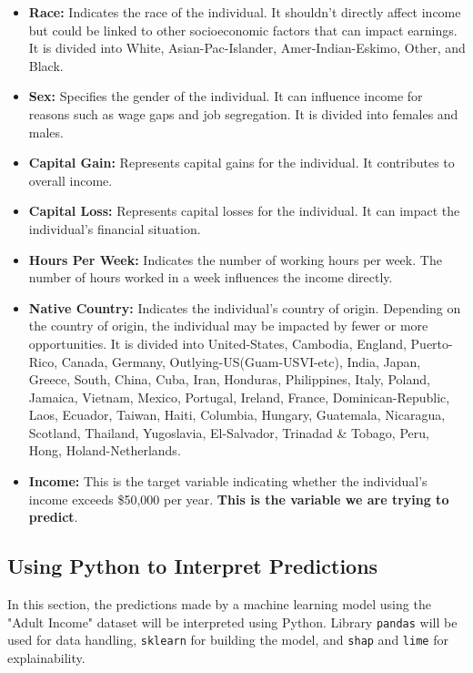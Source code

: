 \documentclass[10pt,journal,compsoc]{IEEEtran}
\begin{document}
\begin{itemize}
    \item \textbf{Race:} Indicates the race of the individual. It shouldn't directly affect income but could be linked to other socioeconomic factors that can impact earnings. It is divided into White, Asian-Pac-Islander, Amer-Indian-Eskimo, Other, and Black.

    \item \textbf{Sex:} Specifies the gender of the individual. It can influence income for reasons such as wage gaps and job segregation. It is divided into females and males.

    \item \textbf{Capital Gain:} Represents capital gains for the individual. It contributes to overall income.

    \item \textbf{Capital Loss:} Represents capital losses for the individual. It can impact the individual's financial situation.

    \item \textbf{Hours Per Week:} Indicates the number of working hours per week. The number of hours worked in a week influences the income directly.

    \item \textbf{Native Country:} Indicates the individual's country of origin. Depending on the country of origin, the individual may be impacted by fewer or more opportunities. It is divided into United-States, Cambodia, England, Puerto-Rico, Canada, Germany, Outlying-US(Guam-USVI-etc), India, Japan, Greece, South, China, Cuba, Iran, Honduras, Philippines, Italy, Poland, Jamaica, Vietnam, Mexico, Portugal, Ireland, France, Dominican-Republic, Laos, Ecuador, Taiwan, Haiti, Columbia, Hungary, Guatemala, Nicaragua, Scotland, Thailand, Yugoslavia, El-Salvador, Trinadad \& Tobago, Peru, Hong, Holand-Netherlands.

    \item \textbf{Income:} This is the target variable indicating whether the individual's income exceeds  \$50,000 per year. \textbf{This is the variable we are trying to predict}.

\end{itemize}

\subsection{Using Python to Interpret Predictions}
In this section, the predictions made by a machine learning model using the "Adult Income" dataset will be interpreted using Python. Library \texttt{pandas} will be used for data handling, \texttt{sklearn} for building the model, and \texttt{shap} and \texttt{lime} for explainability.
\end{document}
